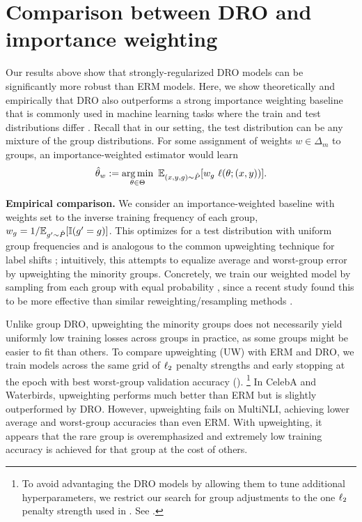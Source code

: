 \section{Comparison between DRO and importance weighting}\label{sec:resampling}

Our results above show that strongly-regularized DRO models can be significantly more robust than ERM models.
Here, we show theoretically and empirically that DRO also outperforms a strong importance weighting baseline that is commonly used in machine learning tasks where the train and test distributions differ \citep{shimodaira2000improving, byrd2019effect}.
Recall that in our setting, the test distribution can be any mixture of the group distributions.
For some assignment of weights $w \in \Delta_m$ to groups, an importance-weighted estimator would learn
\begin{align}
  \htw \eqdef \argmin_{\theta \in \Theta} \ \E_{(x,y,g) \sim \hP}[w_g \ \ell(\theta; (x, y))].
\end{align}


\textbf{Empirical comparison.}
We consider an importance-weighted baseline with weights set to the inverse training frequency of each group,
 $w_g = 1 / \mathbb{E}_{g^\prime \sim {\hat{P}}} [\mathbb{I}(g^\prime = g)]$.
This optimizes for a test distribution with uniform group frequencies
and is analogous to the common upweighting technique for label shifts
\citep{cui2019class, cao2019learning};
intuitively, this attempts to equalize average and worst-group error by upweighting the minority groups.
Concretely,
we train our weighted model by sampling from each group with equal probability \citep{shen2016relay},
since a recent study found this to be more effective than similar reweighting/resampling methods \citep{buda2018systematic}.

Unlike group DRO, upweighting the minority groups does not necessarily yield uniformly low training losses across groups in practice, as some groups might be easier to fit than others.
To compare upweighting (UW) with ERM and DRO,
we train models across the same grid of $\ell_2$ penalty strengths and early stopping at the epoch with best worst-group validation accuracy ().%
\footnote{To avoid advantaging the DRO models by allowing them to tune additional hyperparameters,
we restrict our search for group adjustments to the one $\ell_2$ penalty strength used in . See .}
In CelebA and Waterbirds,
upweighting performs much better than ERM but is slightly outperformed by DRO.
However, upweighting fails on MultiNLI, achieving lower average and worst-group accuracies than even ERM.
With upweighting, it appears that the rare group is overemphasized and extremely low training accuracy is achieved for that group at the cost of others.


